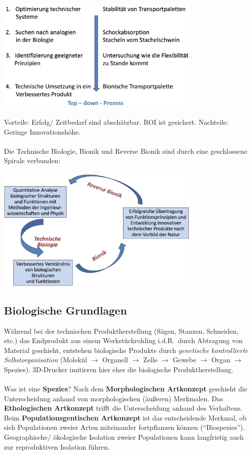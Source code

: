 \begin{center}
	\includegraphics[width=10cm]{lec1/figures/top-down.png}
\end{center}
Vorteile: Erfolg/ Zeitbedarf sind abschätzbar. ROI ist gesichert. Nachteile: Geringe Innovationshöhe.
\\
\\
Die Technische Biologie, Bionik und Reverse Bionik sind durch eine geschlossene Spirale verbunden:
\begin{center}
	\includegraphics[width=10cm]{lec1/figures/spirale.png}
\end{center}

\subsection{Biologische Grundlagen}
Während bei der technischen Produktherstellung (Sägen, Stanzen, Schneiden, etc.) das Endprodukt aus einem Werkstückrohling i.d.R.\ durch Abtragung von Material geschieht, entstehen biologische Produkte durch \textit{genetische kontrollierte Selbstorganisation} (Molekül $\rightarrow$ Organell $\rightarrow$ Zelle $\rightarrow$ Gewebe $\rightarrow$ Organ $\rightarrow$ Spezies). 3D-Drucker imitieren hier eher die biologische Produktherstellung.
\\
\\
Was ist eine \textbf{Spezies}? Nach dem \textbf{Morphologischen Artkonzept} geschieht die Unterscheidung anhand von morphologischen (äußeren) Merkmalen. Das \textbf{Ethologischen Artkonzept} trifft die Unterscheidung anhand des Verhaltens. Beim \textbf{Populationsgentischen Artkonzept} ist das entscheidende Merkmal, ob sich Populationen zweier Arten miteinander fortpflanzen können (``Biospezies''). Geographische/ ökologische Isolation zweier Populationen kann langfristig auch zur reproduktiven Isolation führen. 

